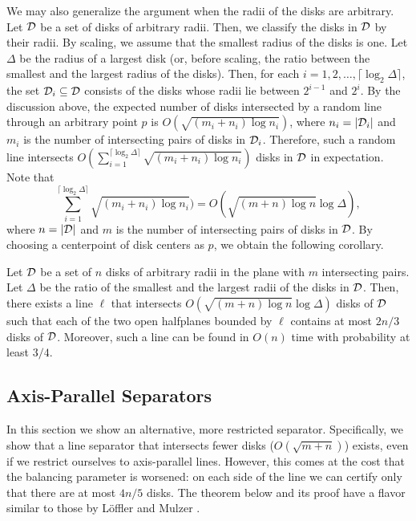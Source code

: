 \documentclass{llncs}
\begin{document}
We may also generalize the argument when the radii of the disks are arbitrary.
Let $\cal{D}$ be a set of disks of arbitrary radii.
Then, we classify the disks in $\cal{D}$ by their radii.
By scaling, we assume that the smallest radius of the disks is one.
Let $\Delta$ be the radius of a largest disk (or, before scaling,
the ratio between the smallest and the largest radius of the disks).
Then, for each $i  = 1,2,\dots,\lceil \log_2 \Delta \rceil$,
the set ${\cal D}_i \subseteq \cal{D}$ consists of 
the disks whose radii lie between $2^{i-1}$ and $2^i$.
By the discussion above, the expected number of disks intersected by
a random line through an arbitrary point $p$ is $O(\sqrt{(m_i+n_i)\log n_i})$,
where $n_i=|{\cal D}_i|$ and $m_i$ is the number of intersecting pairs
of disks in ${\cal D}_i$.
Therefore, such a random line intersects $O(\sum_{i=1}^{\lceil \log_2\Delta\rceil} \sqrt{(m_i+n_i) \log n_i})$ disks in $\cal{D}$ in expectation.
Note that
\[
 \sum_{i=1}^{\lceil \log_2\Delta\rceil} \sqrt{(m_i+n_i) \log n_i})
 = O(\sqrt{(m+n)\log n}\log \Delta),
\]
where $n=|\cal{D}|$ and $m$ is the number of intersecting pairs of
disks in $\cal{D}$.
By choosing a  centerpoint of disk centers as $p$,
we obtain the following corollary.
\begin{corollary}
\label{cor:arb_radii}
Let $\cal{D}$ be a set of $n$ disks of arbitrary radii in the plane with $m$ intersecting pairs.
Let $\Delta$ be the ratio of the smallest and the largest radii of the disks in $\cal{D}$.
Then, there exists a line $\ell$ that intersects $O(\sqrt{(m+n)\log n}\log \Delta)$ disks
of ${\cal D}$ such that each of the two open halfplanes bounded by $\ell$ contains
at most $2n/3$ disks of ${\cal D}$.
Moreover, such a line can be found in $O(n)$ time with probability at least $3/4$.
\end{corollary}




\subsection{Axis-Parallel Separators}
In this section we show an alternative, more restricted separator. Specifically, we show that a line separator that intersects fewer disks ($O(\sqrt{m+n})$) exists, even if we restrict ourselves to axis-parallel lines. However, this comes at the cost that the balancing parameter is worsened:
on each side of the line we can certify only that there are at most $4n/5$ disks. 
The theorem below and its proof have a flavor similar to those by L\"offler and Mulzer \cite{DBLP:journals/jocg/LofflerM14}.
\end{document}
